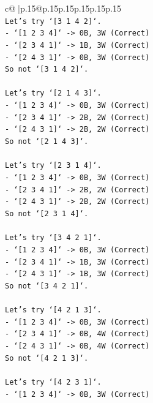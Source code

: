 \documentclass{article}
\begin{document}
{\begin{supertabular}{c@{$\;$}|p{.15\linewidth}@{}p{.15\linewidth}p{.15\linewidth}p{.15\linewidth}p{.15\linewidth}p{.15\linewidth}}
{{{\\ 
\texttt{Let's try `{[}3 1 4 2{]}`.} \\
\texttt{{-} `{[}1 2 3 4{]}` {-}> 0B, 3W (Correct)} \\
\texttt{{-} `{[}2 3 4 1{]}` {-}> 1B, 3W (Correct)} \\
\texttt{{-} `{[}2 4 3 1{]}` {-}> 0B, 3W (Correct)} \\
\texttt{So not `{[}3 1 4 2{]}`.} \\
\\ 
\texttt{Let's try `{[}2 1 4 3{]}`.} \\
\texttt{{-} `{[}1 2 3 4{]}` {-}> 0B, 3W (Correct)} \\
\texttt{{-} `{[}2 3 4 1{]}` {-}> 2B, 2W (Correct)} \\
\texttt{{-} `{[}2 4 3 1{]}` {-}> 2B, 2W (Correct)} \\
\texttt{So not `{[}2 1 4 3{]}`.} \\
\\ 
\texttt{Let's try `{[}2 3 1 4{]}`.} \\
\texttt{{-} `{[}1 2 3 4{]}` {-}> 0B, 3W (Correct)} \\
\texttt{{-} `{[}2 3 4 1{]}` {-}> 2B, 2W (Correct)} \\
\texttt{{-} `{[}2 4 3 1{]}` {-}> 2B, 2W (Correct)} \\
\texttt{So not `{[}2 3 1 4{]}`.} \\
\\ 
\texttt{Let's try `{[}3 4 2 1{]}`.} \\
\texttt{{-} `{[}1 2 3 4{]}` {-}> 0B, 3W (Correct)} \\
\texttt{{-} `{[}2 3 4 1{]}` {-}> 1B, 3W (Correct)} \\
\texttt{{-} `{[}2 4 3 1{]}` {-}> 1B, 3W (Correct)} \\
\texttt{So not `{[}3 4 2 1{]}`.} \\
\\ 
\texttt{Let's try `{[}4 2 1 3{]}`.} \\
\texttt{{-} `{[}1 2 3 4{]}` {-}> 0B, 3W (Correct)} \\
\texttt{{-} `{[}2 3 4 1{]}` {-}> 0B, 4W (Correct)} \\
\texttt{{-} `{[}2 4 3 1{]}` {-}> 0B, 4W (Correct)} \\
\texttt{So not `{[}4 2 1 3{]}`.} \\
\\ 
\texttt{Let's try `{[}4 2 3 1{]}`.} \\
\texttt{{-} `{[}1 2 3 4{]}` {-}> 0B, 3W (Correct)} \\
}}}
\end{supertabular}}
\end{document}
